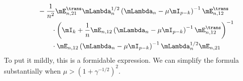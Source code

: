 \begin{align*}
\begin{split}
            &\qquad-
            \frac{1}{n^2}
            \mE_{n,21}^\trans
            \mLambda_{n}^{1/2}
            \left(
                \mLambda_n
                -
                \mu
                \mI_{p-k}
            \right)^{-1}
            \mE_{n,12}^\trans \\
            &\qquad\qquad\cdot
            \left(
                \mI_k
                +
                \frac{1}{n}
                \mE_{n,12}
                \left(
                    \mLambda_n
                    -
                    \mu
                    \mI_{p-k}
                \right)^{-1}
                \mE_{n,12}^\trans
            \right)^{-1} \\
            &\qquad\qquad\cdot
            \mE_{n,12}
            \left(
                \mLambda_n
                -
                \mu
                \mI_{p-k}
            \right)^{-1}
            \mLambda_{n}^{1/2}
            \mE_{n,21}
    \end{split}
\end{align*}
To put it mildly, this is a formidable expression.  We can simplify the formula substantially when $\mu > \left(1 + \gamma^{-1/2} \right)^2$.

